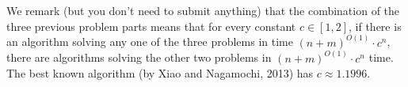 \documentclass[11pt]{article}
\begin{document}
\begin{enumerate}
\begin{enumerate}
 \end{enumerate}
 We remark (but you don't need to submit anything) that the combination of the three previous problem parts means that for every constant $c\in [1,2]$, if there is an algorithm solving any one of the three problems in time $(n+m)^{O(1)}\cdot c^n$, there are algorithms solving the other two problems in $(n+m)^{O(1)}\cdot c^n$ time.  The best known algorithm (by Xiao and Nagamochi, 2013) has $c \approx 1.1996$.
 
 

 
\end{enumerate}
\end{document}
